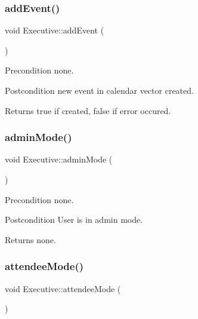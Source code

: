 \subsubsection{\texorpdfstring{add\+Event()}{addEvent()}}
{\footnotesize\ttfamily void Executive\+::add\+Event (\begin{DoxyParamCaption}{ }\end{DoxyParamCaption})\hspace{0.3cm}{\ttfamily [private]}}

\begin{DoxyPrecond}{Precondition}
none. 
\end{DoxyPrecond}
\begin{DoxyPostcond}{Postcondition}
new event in calendar vector created. 
\end{DoxyPostcond}
\begin{DoxyReturn}{Returns}
true if created, false if error occured. 
\end{DoxyReturn}
\mbox{\label{class_executive_af662ff9fa35251d64e4fe7cdfea14baf}} 
\subsubsection{\texorpdfstring{admin\+Mode()}{adminMode()}}
{\footnotesize\ttfamily void Executive\+::admin\+Mode (\begin{DoxyParamCaption}{ }\end{DoxyParamCaption})\hspace{0.3cm}{\ttfamily [private]}}

\begin{DoxyPrecond}{Precondition}
none. 
\end{DoxyPrecond}
\begin{DoxyPostcond}{Postcondition}
User is in admin mode. 
\end{DoxyPostcond}
\begin{DoxyReturn}{Returns}
none. 
\end{DoxyReturn}
\mbox{\label{class_executive_a56c8e76b140c48b0cc561619f1d4167c}} 
\subsubsection{\texorpdfstring{attendee\+Mode()}{attendeeMode()}}
{\footnotesize\ttfamily void Executive\+::attendee\+Mode (\begin{DoxyParamCaption}{ }\end{DoxyParamCaption})\hspace{0.3cm}{\ttfamily [private]}}


